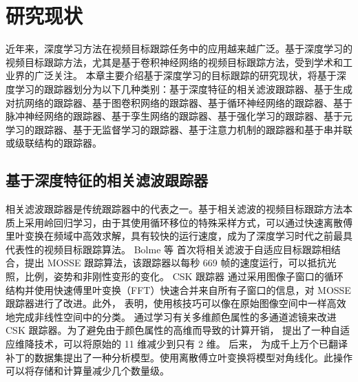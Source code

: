 \chapter{研究现状} \label{chap:related}
近年来，深度学习方法在视频目标跟踪任务中的应用越来越广泛。基于深度学习的视频目标跟踪方法，尤其是基于卷积神经网络的视频目标跟踪方法，受到学术和工业界的广泛关注。
本章主要介绍基于深度学习的目标跟踪的研究现状，将基于深度学习的跟踪器划分为以下几种类别：基于深度特征的相关滤波跟踪器、基于生成对抗网络的跟踪器、基于图卷积网络的跟踪器、基于循环神经网络的跟踪器、基于脉冲神经网络的跟踪器、基于孪生网络的跟踪器、基于强化学习的跟踪器、基于元学习的跟踪器、基于无监督学习的跟踪器、基于注意力机制的跟踪器和基于串并联或级联结构的跟踪器。

\section{基于深度特征的相关滤波跟踪器}
相关滤波跟踪器是传统跟踪器中的代表之一。基于相关滤波的视频目标跟踪方法本质上采用岭回归学习，由于其使用循环移位的特殊采样方式，可以通过快速离散傅里叶变换在频域中高效求解，具有较快的运行速度，成为了深度学习时代之前最具代表性的视频目标跟踪算法。
Bolme 等 \cite{MOSSE} 首次将相关滤波于自适应目标跟踪相结合，提出 MOSSE 跟踪算法，该跟踪器以每秒 669 帧的速度运行，可以抵抗光照，比例，姿势和非刚性变形的变化。
CSK 跟踪器 \cite{Henriques2012ExploitingTC} 通过采用图像子窗口的循环结构并使用快速傅里叶变换（FFT）快速合并来自所有子窗口的信息，对 MOSSE 跟踪器进行了改进。此外， \cite{Henriques2012ExploitingTC} 表明，使用核技巧可以像在原始图像空间中一样高效地完成非线性空间中的分类。
\cite{Danelljan2014AdaptiveCA} 通过学习有关多维颜色属性的多通道滤镜来改进 CSK 跟踪器。为了避免由于颜色属性的高维而导致的计算开销，\cite{Danelljan2014AdaptiveCA} 提出了一种自适应维降技术，可以将原始的 11 维减少到只有 2 维。
后来，\cite{henriques2014high-speed} 为成千上万个已翻译补丁的数据集提出了一种分析模型。使用离散傅立叶变换将模型对角线化。此操作可以将存储和计算量减少几个数量级。

